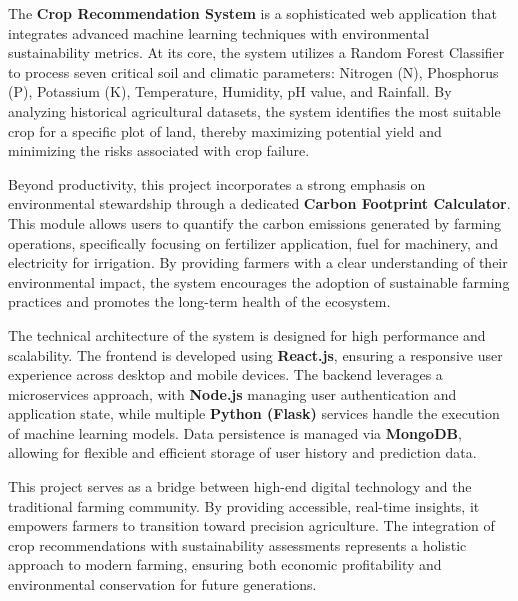 \documentclass[12pt,a4paper]{report}
\begin{document}
The \textbf{Crop Recommendation System} is a sophisticated web application that integrates advanced machine learning techniques with environmental sustainability metrics. At its core, the system utilizes a Random Forest Classifier to process seven critical soil and climatic parameters: Nitrogen (N), Phosphorus (P), Potassium (K), Temperature, Humidity, pH value, and Rainfall. By analyzing historical agricultural datasets, the system identifies the most suitable crop for a specific plot of land, thereby maximizing potential yield and minimizing the risks associated with crop failure.

Beyond productivity, this project incorporates a strong emphasis on environmental stewardship through a dedicated \textbf{Carbon Footprint Calculator}. This module allows users to quantify the carbon emissions generated by farming operations, specifically focusing on fertilizer application, fuel for machinery, and electricity for irrigation. By providing farmers with a clear understanding of their environmental impact, the system encourages the adoption of sustainable farming practices and promotes the long-term health of the ecosystem.

The technical architecture of the system is designed for high performance and scalability. The frontend is developed using \textbf{React.js}, ensuring a responsive user experience across desktop and mobile devices. The backend leverages a microservices approach, with \textbf{Node.js} managing user authentication and application state, while multiple \textbf{Python (Flask)} services handle the execution of machine learning models. Data persistence is managed via \textbf{MongoDB}, allowing for flexible and efficient storage of user history and prediction data.

This project serves as a bridge between high-end digital technology and the traditional farming community. By providing accessible, real-time insights, it empowers farmers to transition toward precision agriculture. The integration of crop recommendations with sustainability assessments represents a holistic approach to modern farming, ensuring both economic profitability and environmental conservation for future generations.


\newpage
\end{document}

